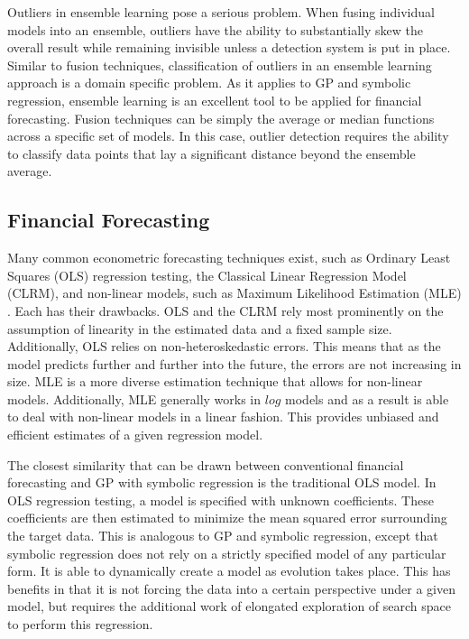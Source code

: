 \documentclass[12pt, letterpaper]{article}
\begin{document}
\textrm{ \indent Outliers in ensemble learning pose a serious problem. When fusing individual models into an ensemble, outliers have the ability to substantially skew the overall result while remaining invisible unless a detection system is put in place. Similar to fusion techniques, classification of outliers in an ensemble learning approach is a domain specific problem. As it applies to GP and symbolic regression, ensemble learning is an excellent tool to be applied for financial forecasting. Fusion techniques can be simply the average or median functions across a specific set of models. In this case, outlier detection requires the ability to classify data points that lay a significant distance beyond the ensemble average.  }

\subsection{Financial Forecasting}

\textrm{ \indent Many common econometric forecasting techniques exist, such as Ordinary Least Squares (OLS) regression testing, the Classical Linear Regression Model (CLRM), and non-linear models, such as Maximum Likelihood Estimation (MLE) \cite{econometrics}. Each has their drawbacks. OLS and the CLRM rely most prominently on the assumption of linearity in the estimated data and a fixed sample size. Additionally, OLS relies on non-heteroskedastic errors. This means that as the model predicts further and further into the future, the errors are not increasing in size. MLE is a more diverse estimation technique that allows for non-linear models. Additionally, MLE generally works in $log$ models and as a result is able to deal with non-linear models in a linear fashion. This provides unbiased and efficient estimates of a given regression model. }

\textrm{ \indent The closest similarity that can be drawn between conventional financial forecasting and GP with symbolic regression is the traditional OLS model. In OLS regression testing, a model is specified with unknown coefficients. These coefficients are then estimated to minimize the mean squared error surrounding the target data. This is analogous to GP and symbolic regression, except that symbolic regression does not rely on a strictly specified model of any particular form. It is able to dynamically create a model as evolution takes place. This has benefits in that it is not forcing the data into a certain perspective under a given model, but requires the additional work of elongated exploration of search space to perform this regression. }
\end{document}
